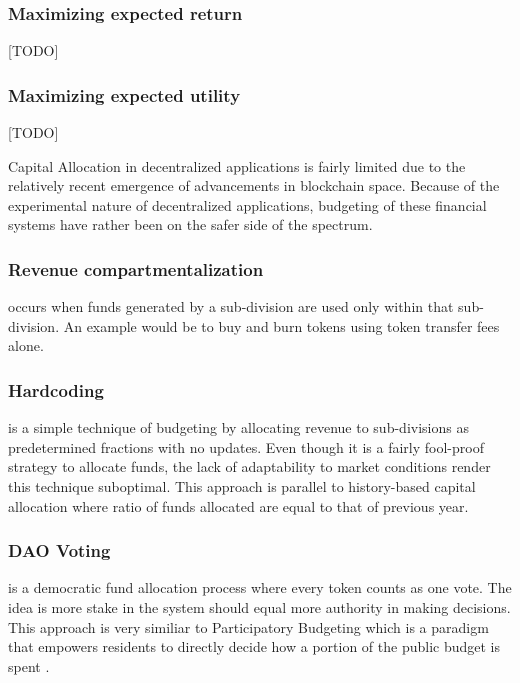 \documentclass[conference,letterpaper]{IEEEtran}
\begin{document}
            \subsubsection{Maximizing expected return}
            [TODO]

            \subsubsection{Maximizing expected utility}
            [TODO]

            Capital Allocation in decentralized applications is fairly limited due to the
            relatively recent emergence of advancements in blockchain space. Because of
            the experimental nature of decentralized applications, budgeting of these
            financial systems have rather been on the safer side of the spectrum.

            \subsubsection{Revenue compartmentalization} occurs when funds generated by a
            sub-division are used only within that sub-division. An example would be to
            buy and burn tokens using token transfer fees alone.

            \subsubsection{Hardcoding} is a simple technique of budgeting by allocating
            revenue to sub-divisions as predetermined fractions with no updates. Even
            though it is a fairly fool-proof strategy to allocate funds, the lack of
            adaptability to market conditions render this technique suboptimal. This
            approach is parallel to history-based capital allocation where ratio of funds
            allocated are equal to that of previous year.

            \subsubsection{DAO Voting} is a democratic fund allocation process where every
            token counts as one vote. The idea is more stake in the system should equal
            more authority in making decisions.  This approach is very similiar to
            Participatory Budgeting which is a paradigm that empowers residents to
            directly decide how a portion of the public budget is spent
            \cite{aziz2021participatory}.
\end{document}
